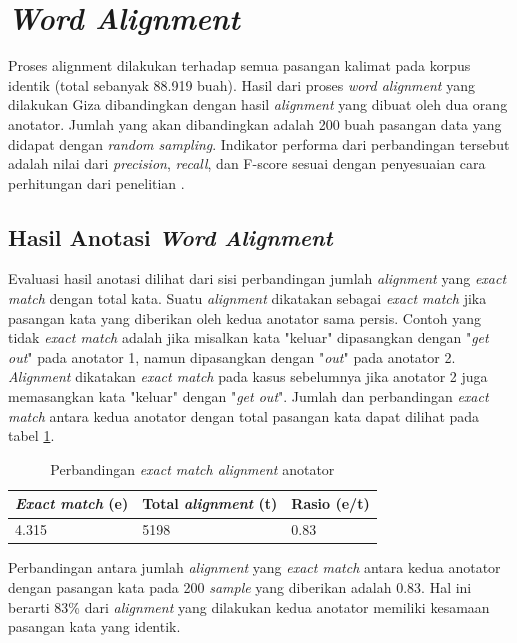 \section{\textit{Word Alignment}}

Proses alignment dilakukan terhadap semua pasangan kalimat pada korpus identik (total sebanyak 88.919 buah). Hasil dari proses \textit{word alignment} yang dilakukan Giza dibandingkan dengan hasil \textit{alignment} yang dibuat oleh dua orang anotator. Jumlah yang akan dibandingkan adalah 200 buah pasangan data yang didapat dengan \textit{random sampling}. Indikator performa dari perbandingan tersebut adalah nilai dari \textit{precision}, \textit{recall}, dan F-score sesuai dengan penyesuaian cara perhitungan dari penelitian \citep{mihalcea2003evaluation}.

\subsection{Hasil Anotasi \textit{Word Alignment}}

Evaluasi hasil anotasi dilihat dari sisi perbandingan jumlah \textit{alignment} yang \textit{exact match} dengan total kata. Suatu \textit{alignment} dikatakan sebagai \textit{exact match} jika pasangan kata yang diberikan oleh kedua anotator sama persis. Contoh yang tidak \textit{exact match} adalah jika misalkan kata "keluar" dipasangkan dengan "\textit{get out}" pada anotator 1, namun dipasangkan dengan "\textit{out}" pada anotator 2. \textit{Alignment} dikatakan \textit{exact match} pada kasus sebelumnya jika anotator 2 juga memasangkan kata "keluar" dengan "\textit{get out}". Jumlah dan perbandingan \textit{exact match} antara kedua anotator dengan total pasangan kata dapat dilihat pada tabel \ref{table:exact-match-anotator}.

\begin{table}
	\centering
	\caption{Perbandingan \textit{exact match alignment} anotator}
	\label{table:exact-match-anotator}
	\begin{tabular}{|p{3cm}|p{3cm}|p{3cm}|}
		\hline
		\textbf{\textit{Exact match} (e)} & \textbf{Total \textit{alignment} (t)} & \textbf{Rasio (e/t)}
		\\ \hline
		4.315 & 5198 & 0.83 \\ \hline
	\end{tabular} 
\end{table}

Perbandingan antara jumlah \textit{alignment} yang \textit{exact match} antara kedua anotator dengan pasangan kata pada 200 \textit{sample} yang diberikan adalah 0.83. Hal ini berarti 83\% dari \textit{alignment} yang dilakukan kedua anotator memiliki kesamaan pasangan kata yang identik.


